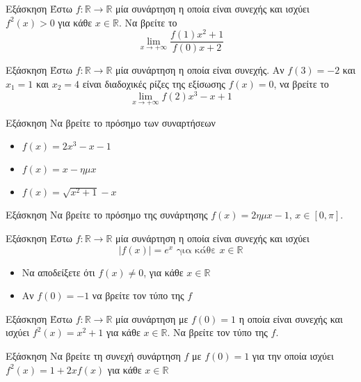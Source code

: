 \documentclass[greek]{beamer}
\begin{document}
\begin{frame}{Εξάσκηση}
 Έστω $f:\mathbb{R}\to\mathbb{R}$ μία συνάρτηση η οποία είναι συνεχής και ισχύει $f^2(x)>0$ για κάθε $x\in\mathbb{R}$. Να βρείτε το
 $$\lim\limits_{x \to +\infty}{ \frac{f(1)x^2+1}{f(0)x+2} }$$
\end{frame}

\begin{frame}{Εξάσκηση}
 Έστω $f:\mathbb{R}\to\mathbb{R}$ μία συνάρτηση η οποία είναι συνεχής. Αν $f(3)=-2$ και $x_1=1$ και $x_2=4$ είναι διαδοχικές ρίζες της εξίσωσης $f(x)=0$, να βρείτε το
 $$\lim\limits_{x \to +\infty}{ f(2)x^3-x+1 }$$
\end{frame}

\begin{frame}{Εξάσκηση}
 Να βρείτε το πρόσημο των συναρτήσεων
 \begin{itemize}
  \item $f(x)=2x^3-x-1$
  \item $f(x)=x-ημx$
  \item $f(x)=\sqrt{x^2+1}-x$
 \end{itemize}
\end{frame}

\begin{frame}{Εξάσκηση}
 Να βρείτε το πρόσημο της συνάρτησης $f(x)=2ημx-1$, $x\in [0,π]$.
\end{frame}

\begin{frame}{Εξάσκηση}
 Έστω $f:\mathbb{R}\to\mathbb{R}$ μία συνάρτηση η οποία είναι συνεχής και ισχύει
 $$|f(x)|=e^x \text{ για κάθε } x\in\mathbb{R}$$
 \begin{itemize}
  \item Να αποδείξετε ότι $f(x)\ne 0$, για κάθε $x\in\mathbb{R}$
  \item Αν $f(0)=-1$ να βρείτε τον τύπο της $f$
 \end{itemize}
\end{frame}

\begin{frame}{Εξάσκηση}
 Έστω $f:\mathbb{R}\to\mathbb{R}$ μία συνάρτηση με $f(0)=1$ η οποία είναι συνεχής και ισχύει $f^2(x)=x^2+1$ για κάθε $x\in\mathbb{R}$. Να βρείτε τον τύπο της $f$.
\end{frame}

\begin{frame}{Εξάσκηση}
 Να βρείτε τη συνεχή συνάρτηση $f$ με $f(0)=1$ για την οποία ισχύει $f^2(x)=1+2xf(x)$ για κάθε $x\in\mathbb{R}$
\end{frame}
\end{document}
